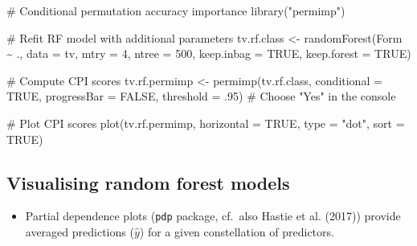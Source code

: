 \documentclass[
  11pt,
  letterpaper,
  DIV=11,
  numbers=noendperiod]{scrreprt}
\newenvironment{Shaded}{\begin{snugshade}}{\end{snugshade}}
\newcommand{\AttributeTok}[1]{\textcolor[rgb]{0.40,0.45,0.13}{#1}}
\newcommand{\CommentTok}[1]{\textcolor[rgb]{0.37,0.37,0.37}{#1}}
\newcommand{\ConstantTok}[1]{\textcolor[rgb]{0.56,0.35,0.01}{#1}}
\newcommand{\DecValTok}[1]{\textcolor[rgb]{0.68,0.00,0.00}{#1}}
\newcommand{\FunctionTok}[1]{\textcolor[rgb]{0.28,0.35,0.67}{#1}}
\newcommand{\NormalTok}[1]{\textcolor[rgb]{0.00,0.23,0.31}{#1}}
\newcommand{\OtherTok}[1]{\textcolor[rgb]{0.00,0.23,0.31}{#1}}
\newcommand{\SpecialCharTok}[1]{\textcolor[rgb]{0.37,0.37,0.37}{#1}}
\newcommand{\StringTok}[1]{\textcolor[rgb]{0.13,0.47,0.30}{#1}}
\providecommand{\tightlist}{%
  \setlength{\itemsep}{0pt}\setlength{\parskip}{0pt}}\usepackage{longtable,booktabs,array}
\begin{document}
\begin{Shaded}
\begin{Highlighting}[]
\CommentTok{\# Conditional permutation accuracy importance}
\FunctionTok{library}\NormalTok{(}\StringTok{"permimp"}\NormalTok{)}

\CommentTok{\# Refit RF model with additional parameters}
\NormalTok{tv.rf.class }\OtherTok{\textless{}{-}} \FunctionTok{randomForest}\NormalTok{(Form }\SpecialCharTok{\textasciitilde{}}\NormalTok{ .,}
                            \AttributeTok{data =}\NormalTok{ tv,}
                            \AttributeTok{mtry =} \DecValTok{4}\NormalTok{,}
                            \AttributeTok{ntree =} \DecValTok{500}\NormalTok{,}
                            \AttributeTok{keep.inbag =} \ConstantTok{TRUE}\NormalTok{,}
                            \AttributeTok{keep.forest =} \ConstantTok{TRUE}\NormalTok{)}

\CommentTok{\# Compute CPI scores}
\NormalTok{tv.rf.permimp }\OtherTok{\textless{}{-}} \FunctionTok{permimp}\NormalTok{(tv.rf.class, }\AttributeTok{conditional =} \ConstantTok{TRUE}\NormalTok{, }\AttributeTok{progressBar =} \ConstantTok{FALSE}\NormalTok{, }\AttributeTok{threshold =}\NormalTok{ .}\DecValTok{95}\NormalTok{) }\CommentTok{\# Choose "Yes" in the console}

\CommentTok{\# Plot CPI scores}
\FunctionTok{plot}\NormalTok{(tv.rf.permimp, }\AttributeTok{horizontal =} \ConstantTok{TRUE}\NormalTok{, }\AttributeTok{type =} \StringTok{"dot"}\NormalTok{, }\AttributeTok{sort =} \ConstantTok{TRUE}\NormalTok{)}
\end{Highlighting}
\end{Shaded}

\subsection{Visualising random forest
models}\label{visualising-random-forest-models}

\begin{itemize}
\tightlist
\item
  Partial dependence plots (\texttt{pdp} package, cf.~also Hastie et al.
  (2017)) provide averaged predictions (\(\hat{y}\)) for a given
  constellation of predictors.
\end{itemize}
\end{document}
